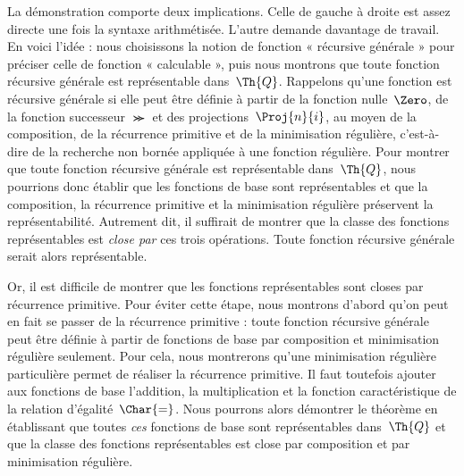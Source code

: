 \documentclass[../../../include/open-logic-section]{subfiles}
\begin{document}
La démonstration comporte deux implications. Celle de gauche à
droite est assez directe une fois la syntaxe arithmétisée. L'autre
demande davantage de travail. En voici l'idée : nous choisissons
la notion de fonction « récursive générale » pour préciser celle
de fonction « calculable », puis nous montrons que toute fonction
récursive générale est représentable dans~$\Th{Q}$. Rappelons
qu'une fonction est récursive générale si elle peut être définie
à partir de la fonction nulle~$\Zero$, de la fonction successeur
$\Succ$ et des projections~$\Proj{n}{i}$, au moyen de la
composition, de la récurrence primitive et de la minimisation
régulière, c'est-à-dire de la recherche non bornée appliquée à
une fonction régulière. Pour montrer que toute fonction récursive
générale est représentable dans~$\Th{Q}$, nous pourrions donc
établir que les fonctions de base sont représentables et que la
composition, la récurrence primitive et la minimisation régulière
préservent la représentabilité. Autrement dit, il suffirait de
montrer que la classe des fonctions représentables est
\emph{close par} ces trois opérations. Toute fonction récursive
générale serait alors représentable.

Or, il est difficile de montrer que les fonctions représentables
sont closes par récurrence primitive. Pour éviter cette étape,
nous montrons d'abord qu'on peut en fait se passer de la
récurrence primitive : toute fonction récursive générale peut
être définie à partir de fonctions de base par composition et
minimisation régulière seulement. Pour cela, nous montrerons
qu'une minimisation régulière particulière permet de réaliser
la récurrence primitive. Il faut toutefois ajouter aux fonctions
de base l'addition, la multiplication et la fonction
caractéristique de la relation d'égalité~$\Char{=}$. Nous
pourrons alors démontrer le théorème en établissant que toutes
\emph{ces} fonctions de base sont représentables dans~$\Th{Q}$
et que la classe des fonctions représentables est close par
composition et par minimisation régulière.
\end{document}
